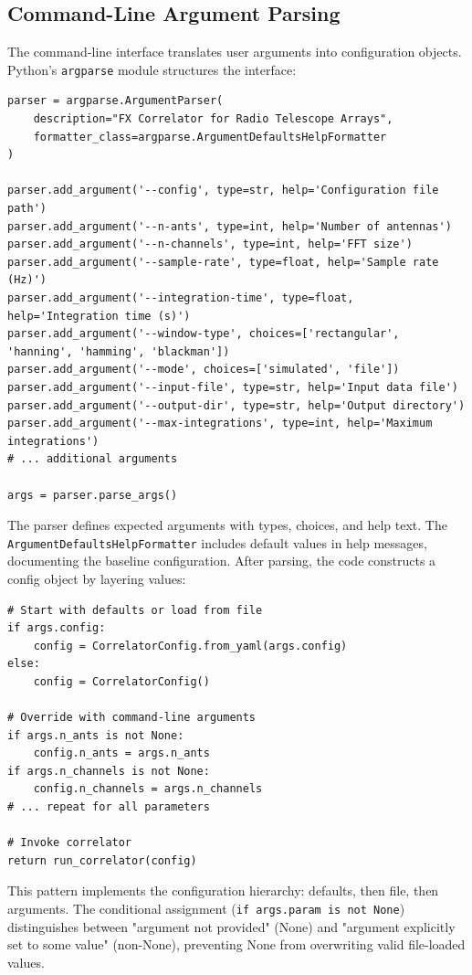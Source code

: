 \subsection{Command-Line Argument Parsing}

The command-line interface translates user arguments into configuration objects. Python's \texttt{argparse} module structures the interface:

\begin{verbatim}
parser = argparse.ArgumentParser(
    description="FX Correlator for Radio Telescope Arrays",
    formatter_class=argparse.ArgumentDefaultsHelpFormatter
)

parser.add_argument('--config', type=str, help='Configuration file path')
parser.add_argument('--n-ants', type=int, help='Number of antennas')
parser.add_argument('--n-channels', type=int, help='FFT size')
parser.add_argument('--sample-rate', type=float, help='Sample rate (Hz)')
parser.add_argument('--integration-time', type=float, help='Integration time (s)')
parser.add_argument('--window-type', choices=['rectangular', 'hanning', 'hamming', 'blackman'])
parser.add_argument('--mode', choices=['simulated', 'file'])
parser.add_argument('--input-file', type=str, help='Input data file')
parser.add_argument('--output-dir', type=str, help='Output directory')
parser.add_argument('--max-integrations', type=int, help='Maximum integrations')
# ... additional arguments

args = parser.parse_args()
\end{verbatim}

The parser defines expected arguments with types, choices, and help text. The \texttt{ArgumentDefaultsHelpFormatter} includes default values in help messages, documenting the baseline configuration. After parsing, the code constructs a config object by layering values:

\begin{verbatim}
# Start with defaults or load from file
if args.config:
    config = CorrelatorConfig.from_yaml(args.config)
else:
    config = CorrelatorConfig()

# Override with command-line arguments
if args.n_ants is not None:
    config.n_ants = args.n_ants
if args.n_channels is not None:
    config.n_channels = args.n_channels
# ... repeat for all parameters

# Invoke correlator
return run_correlator(config)
\end{verbatim}

This pattern implements the configuration hierarchy: defaults, then file, then arguments. The conditional assignment (\texttt{if args.param is not None}) distinguishes between "argument not provided" (None) and "argument explicitly set to some value" (non-None), preventing None from overwriting valid file-loaded values.

